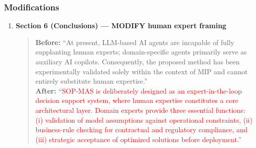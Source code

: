 \documentclass[11pt,a4paper]{article}
\newcommand{\changed}[1]{\textcolor{red}{#1}}
\begin{document}
\subsubsection{Modifications}
\begin{enumerate}
\item \textbf{Section 6 (Conclusions) --- MODIFY human expert framing}
\begin{quote}
\textbf{Before:} ``At present, LLM-based AI agents are incapable of fully supplanting human experts; domain-specific agents primarily serve as auxiliary AI copilots. Consequently, the proposed method has been experimentally validated solely within the context of MIP and cannot entirely substitute human expertise.''\\[4pt]
\textbf{After:} ``\changed{SOP-MAS is deliberately designed as an expert-in-the-loop decision support system, where human expertise constitutes a core architectural layer. Domain experts provide three essential functions: (i) validation of model assumptions against operational constraints, (ii) business-rule checking for contractual and regulatory compliance, and (iii) strategic acceptance of optimized solutions before deployment.}''
\end{quote}
\end{enumerate}
\end{document}

